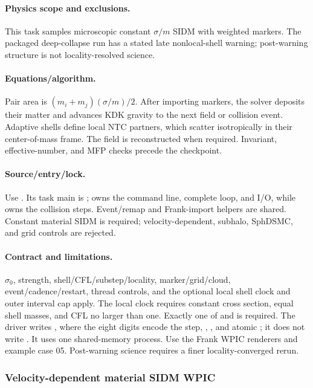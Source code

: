 \paragraph{Physics scope and exclusions.}
This task samples microscopic constant \(\sigma/m\) SIDM with weighted
markers.  The packaged deep-collapse run has a stated late nonlocal-shell
warning; post-warning structure is not locality-resolved science.
\paragraph{Equations/algorithm.}
Pair area is \((m_i+m_j)(\sigma/m)/2\).  After importing markers, the solver deposits their matter and advances
KDK gravity to the next field or collision event. Adaptive shells define
local NTC partners, which scatter isotropically in their center-of-mass
frame. The field is reconstructed when required. Invariant, effective-number,
and MFP checks precede the checkpoint.
\paragraph{Source/entry/lock.}
Use .  Its task main is
;
 owns the command line, complete loop, and
I/O, while  owns the
collision steps.  Event/remap and Frank-import helpers are shared.
Constant material SIDM is required; velocity-dependent, subhalo, SphDSMC, and
grid controls are rejected.
\paragraph{Contract and limitations.}
\(\sigma_0\), strength, shell/CFL/substep/locality, marker/grid/cloud,
event/cadence/restart, thread controls, and the optional local shell clock and
outer interval cap apply.  The local clock requires constant cross section,
equal shell masses, and CFL no larger than one.  Exactly one of
 and  is required.  The driver writes
, where the eight digits encode the step,
,
, and atomic ; it does
not write .  It uses one shared-memory process.  Use the
Frank WPIC renderers and example case 05.
Post-warning science requires a finer locality-converged rerun.

\subsubsection{Velocity-dependent material SIDM WPIC}
